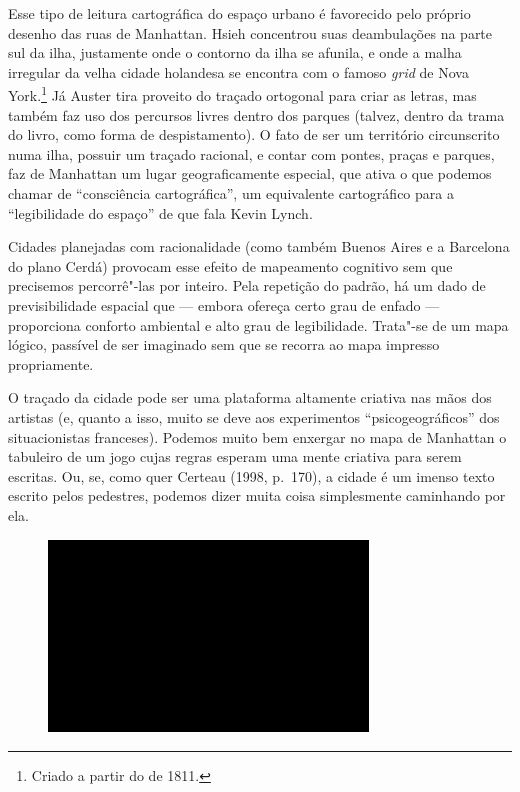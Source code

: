 Esse tipo de leitura cartográfica do espaço urbano é favorecido pelo
próprio desenho das ruas de Manhattan. Hsieh concentrou suas
deambulações na parte sul da ilha, justamente onde o contorno da ilha se
afunila, e onde a malha irregular da velha cidade holandesa se encontra
com o famoso \emph{grid} de Nova York.\footnote{Criado a partir do
  {} de 1811.} Já Auster tira proveito do
traçado ortogonal para criar as letras, mas também faz uso dos percursos
livres dentro dos parques (talvez, dentro da trama do livro, como forma
de despistamento). O fato de ser um território circunscrito numa ilha,
possuir um traçado racional, e contar com pontes, praças e parques, faz
de Manhattan um lugar geograficamente especial, que ativa o que podemos
chamar de ``consciência cartográfica'', um equivalente cartográfico para
a ``legibilidade do espaço'' de que fala Kevin Lynch.

Cidades planejadas com racionalidade (como também Buenos Aires e
a Barcelona do plano Cerdá) provocam esse efeito de mapeamento cognitivo sem que
precisemos percorrê"-las por inteiro. Pela repetição do padrão, há um
dado de previsibilidade espacial que --- embora ofereça certo grau de
enfado --- proporciona conforto ambiental e alto grau de legibilidade.
Trata"-se de um mapa lógico, passível de ser imaginado sem que se recorra
ao mapa impresso propriamente.

O traçado da cidade pode ser uma plataforma altamente criativa nas mãos
dos artistas (e, quanto a isso, muito se deve aos experimentos
``psicogeográficos'' dos situacionistas franceses). Podemos muito bem
enxergar no mapa de Manhattan o tabuleiro de um jogo cujas regras
esperam uma mente criativa para serem escritas. Ou, se, como quer
Certeau (1998, p.~170), a cidade é um imenso texto escrito pelos
pedestres, podemos dizer muita coisa simplesmente caminhando por ela.

\begin{figure}[!ht]

\centering
 \includegraphics[width=85mm]{./imgs/im1.jpg}
\caption{\tiny{}}

\end{figure}


